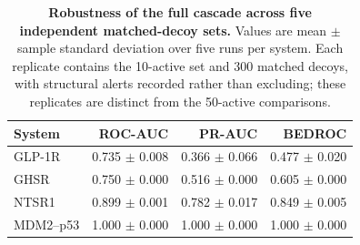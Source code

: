 \begin{table}[tbp]
\centering
\caption{\textbf{Robustness of the full cascade across five independent matched-decoy sets.} Values are mean $\pm$ sample standard deviation over five runs per system. Each replicate contains the 10-active set and 300 matched decoys, with structural alerts recorded rather than excluding; these replicates are distinct from the 50-active comparisons.}
\label{tab:decoy_robustness}
\footnotesize
\setlength{\tabcolsep}{4pt}
\begin{tabular}{@{}lrrr@{}}
\toprule
System & ROC-AUC & PR-AUC & BEDROC \\
\midrule
GLP-1R & 0.735 $\pm$ 0.008 & 0.366 $\pm$ 0.066 & 0.477 $\pm$ 0.020 \\
GHSR & 0.750 $\pm$ 0.000 & 0.516 $\pm$ 0.000 & 0.605 $\pm$ 0.000 \\
NTSR1 & 0.899 $\pm$ 0.001 & 0.782 $\pm$ 0.017 & 0.849 $\pm$ 0.005 \\
MDM2--p53 & 1.000 $\pm$ 0.000 & 1.000 $\pm$ 0.000 & 1.000 $\pm$ 0.000 \\
\bottomrule
\end{tabular}
\end{table}
